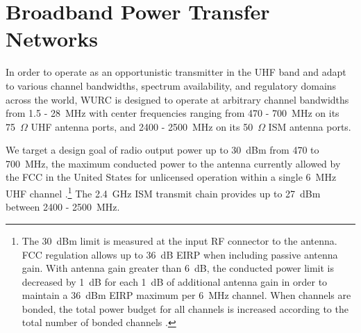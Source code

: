 \section{Broadband Power Transfer Networks}
\label{sec_wurc_pa_design}


	In order to operate as an opportunistic transmitter in the UHF band and adapt to various channel bandwidths, spectrum availability, and regulatory domains across the world, \ac{WURC} is designed to operate at arbitrary channel bandwidths from 1.5 - 28~MHz with center frequencies ranging from 470 - 700~MHz on its 75~$\Omega$ UHF antenna ports, and 2400 - 2500~MHz on its 50~$\Omega$ ISM antenna ports. 

	We target a design goal of radio output power up to 30~dBm from 470 to 700~MHz, the maximum conducted power to the antenna currently allowed by the \ac{FCC} in the United States for unlicensed operation within a single 6~MHz UHF channel \cite{flores2013ieee80211af}.\footnote{The 30~dBm limit is measured at the input RF connector to the antenna. \ac{FCC} regulation allows up to 36~dB \ac{EIRP} when including passive antenna gain. With antenna gain greater than 6~dB, the conducted power limit is decreased by 1~dB for each 1~dB of additional antenna gain in order to maintain a 36~dBm \ac{EIRP} maximum per 6~MHz channel. When channels are bonded, the total power budget for all channels is increased according to the total number of bonded channels \cite{fcc2015ro}.}
	The 2.4~GHz ISM transmit chain provides up to 27~dBm between 2400 - 2500~MHz.

